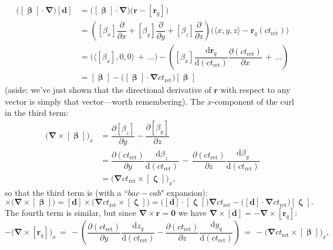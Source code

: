 \documentclass[12pt]{article}
\renewcommand{\vv}[1]{\mathbf{#1}}
\newcommand{\dd}[1]{\mathrm{d}#1}
\newcommand{\vvbeta}{\bm{\upbeta}}
\newcommand{\vvzeta}{\bm{\upzeta}}
\newcommand{\del}{\boldsymbol{\nabla}}
\begin{document}
\begin{equation}\label{eq:secondterm}
\begin{split}
\big( [\vvbeta] \cdot \del \big) [\vv d] &= \big( [\vvbeta] \cdot \del \big) \big( \vv r - [\vv r_q] \big) \\[2pt]
&= \left( [\beta_x] \dfrac{\partial}{\partial x} + [\beta_y] \dfrac{\partial}{\partial y} + [\beta_z] \dfrac{\partial}{\partial z} \right) \big( \langle x, y, z \rangle - \vv r_q(ct_{\mathrm{ret}}) \big) \\[2pt]
&= \Big( \big \langle [\beta_x], 0, 0 \big \rangle \, + \, \dots \Big)  -  \left( [\beta_x] \dfrac{\dd \vv r_q}{\dd (ct_{\mathrm{ret}})} \dfrac{\partial (ct_{\mathrm{ret}})}{\partial x} \, + \, \dots \right) \\[2pt]
&= [\vvbeta] - \big( [\vvbeta] \cdot \del ct_{\mathrm{ret}} \big) [\vvbeta]
\end{split}
\end{equation}
(aside: we've just shown that the directional derivative of $\vv r$ with respect to any vector is simply that vector---worth remembering). The $x$-component of the curl in the third term:
\begin{equation}\label{eq:curlb}
\begin{split}
\big( \del \times [\vvbeta] \big)_x &= \dfrac{\partial [\beta_z]}{\partial y} - \dfrac{\partial [\beta_y]}{\partial z} \\[3pt]
&= \dfrac{\partial (ct_{\mathrm{ret}})}{\partial y} \dfrac{\dd \beta_z}{\dd (ct_{\mathrm{ret}})} \, - \, \dfrac{\partial (ct_{\mathrm{ret}})}{\partial z} \dfrac{\dd \beta_y}{\dd (ct_{\mathrm{ret}})} \\[3pt]
&= \big( \del ct_{\mathrm{ret}} \times [\vvzeta] \big)_x ,
\end{split}
\end{equation}
so that the third term is (with a ``$bac - cab$" expansion):
\begin{equation*}
[\vv d] \times \big( \del \times [\vvbeta] \big) = [\vv d] \times \big( \del ct_{\mathrm{ret}} \times [\vvzeta] \big) = \big( [\vv d] \cdot [\vvzeta] \big) \del ct_{\mathrm{ret}} - \big( [\vv d] \cdot \del ct_{\mathrm{ret}} \big) [\vvzeta] .
\end{equation*}
The fourth term is similar, but since $\del \times \vv r = \vv 0$ we have $\del \times [\vv d] = - \del \times [\vv r_q]$:
\begin{equation*}
- \big( \del \times [\vv r_q] \big)_x \, = \, - \left( \dfrac{\partial (ct_{\mathrm{ret}})}{\partial y} \dfrac{\dd z_q}{\dd (ct_{\mathrm{ret}})} - \dfrac{\partial (ct_{\mathrm{ret}})}{\partial z} \dfrac{\dd y_q}{\dd (ct_{\mathrm{ret}})} \right) \, = \,  - \big( \del ct_{\mathrm{ret}} \times [\vvbeta] \big)_x ,
\end{equation*}
\end{document}
